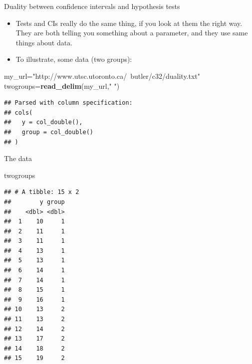\documentclass[ignorenonframetext,]{beamer}
\newenvironment{Shaded}{\begin{snugshade}}{\end{snugshade}}
\newcommand{\KeywordTok}[1]{\textcolor[rgb]{0.13,0.29,0.53}{\textbf{#1}}}
\newcommand{\NormalTok}[1]{#1}
\newcommand{\StringTok}[1]{\textcolor[rgb]{0.31,0.60,0.02}{#1}}
\providecommand{\tightlist}{%
  \setlength{\itemsep}{0pt}\setlength{\parskip}{0pt}}
\begin{document}
\begin{frame}[fragile]{Duality between confidence intervals and
hypothesis tests}
\protect\hypertarget{duality-between-confidence-intervals-and-hypothesis-tests}{}

\begin{itemize}
\tightlist
\item
  Tests and CIs really do the same thing, if you look at them the right
  way. They are both telling you something about a parameter, and they
  use same things about data.
\item
  To illustrate, some data (two groups):
\end{itemize}

\begin{Shaded}
\begin{Highlighting}[]
\NormalTok{my_url=}\StringTok{"http://www.utsc.utoronto.ca/~butler/c32/duality.txt"}
\NormalTok{twogroups=}\KeywordTok{read_delim}\NormalTok{(my_url,}\StringTok{" "}\NormalTok{)}
\end{Highlighting}
\end{Shaded}

\begin{verbatim}
## Parsed with column specification:
## cols(
##   y = col_double(),
##   group = col_double()
## )
\end{verbatim}

\end{frame}

\begin{frame}[fragile]{The data}
\protect\hypertarget{the-data-2}{}

\footnotesize

\begin{Shaded}
\begin{Highlighting}[]
\NormalTok{twogroups}
\end{Highlighting}
\end{Shaded}

\begin{verbatim}
## # A tibble: 15 x 2
##        y group
##    <dbl> <dbl>
##  1    10     1
##  2    11     1
##  3    11     1
##  4    13     1
##  5    13     1
##  6    14     1
##  7    14     1
##  8    15     1
##  9    16     1
## 10    13     2
## 11    13     2
## 12    14     2
## 13    17     2
## 14    18     2
## 15    19     2
\end{verbatim}

\normalsize

\end{frame}
\end{document}
